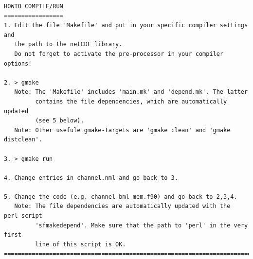 \documentclass[twoside]{article}
\begin{document}
\begin{verbatim}
HOWTO COMPILE/RUN
=================
1. Edit the file 'Makefile' and put in your specific compiler settings and
   the path to the netCDF library.
   Do not forget to activate the pre-processor in your compiler options!

2. > gmake
   Note: The 'Makefile' includes 'main.mk' and 'depend.mk'. The latter
         contains the file dependencies, which are automatically updated
         (see 5 below).
   Note: Other usefule gmake-targets are 'gmake clean' and 'gmake distclean'.

3. > gmake run

4. Change entries in channel.nml and go back to 3.

5. Change the code (e.g. channel_bml_mem.f90) and go back to 2,3,4.
   Note: The file dependencies are automatically updated with the perl-script
         'sfmakedepend'. Make sure that the path to 'perl' in the very first
         line of this script is OK.
==============================================================================
\end{verbatim}


\end{document}
